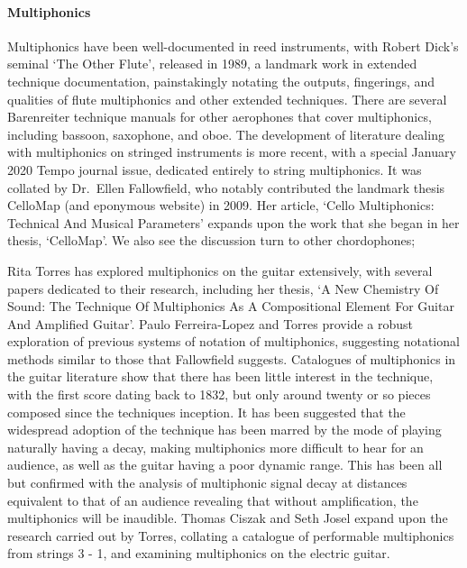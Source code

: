 \paragraph{Multiphonics}
Multiphonics have been well-documented in reed instruments, with Robert Dick's seminal `The Other Flute', released in 1989, a landmark work in extended technique documentation, painstakingly notating the outputs, fingerings, and qualities of flute multiphonics and other extended techniques.\autocite{dickOtherFlute1989}
There are several Barenreiter technique manuals for other aerophones that cover multiphonics, including bassoon, saxophone, and oboe.\autocite{weissTechniquesSaxophonePlaying2010,galloisTechniquesBassoonPlaying2009, TODO:OboeBook}
The development of literature dealing with multiphonics on stringed instruments is more recent, with a special January 2020 Tempo journal issue, dedicated entirely to string multiphonics.
It was collated by Dr.\ Ellen Fallowfield, who notably contributed the landmark thesis CelloMap (and eponymous website) in 2009.\autocite{fallowfieldCelloMapHandbook2009, fallowfieldCelloMap}
Her article, `Cello Multiphonics: Technical And Musical Parameters' expands upon the work that she began in her thesis, `CelloMap'.\autocite{fallowfieldCelloMultiphonicsTechnical2020}
We also see the discussion turn to other chordophones; 


Rita Torres has explored multiphonics on the guitar extensively, with several papers dedicated to their research, including her thesis, `A New Chemistry Of Sound: The Technique Of Multiphonics As A Compositional Element For Guitar And Amplified Guitar'.\autocite{torresMultiphonicsCompositionalElement2012}
Paulo Ferreira-Lopez and Torres provide a robust exploration of previous systems of notation of multiphonics, suggesting notational methods similar to those that Fallowfield suggests.\autocite{ferreira-lopesGuitarMultiphonicsNotations}
Catalogues of multiphonics in the guitar literature show that there has been little interest in the technique, with the first score dating back to 1832, but only around twenty or so pieces composed since the techniques inception.\autocite[80--82]{torresSoundWorldGuitar2018}
It has been suggested that the widespread adoption of the technique has been marred by the mode of playing naturally having a decay, making multiphonics more difficult to hear for an audience, as well as the guitar having a poor dynamic range.\autocite[21--22]{Torres2014TowardsOT}
This has been all but confirmed with the analysis of multiphonic signal decay at distances equivalent to that of an audience revealing that without amplification, the multiphonics will be inaudible.\autocite[279]{torresGuitarMultiphonicsInfluence2014}
Thomas Ciszak and Seth Josel expand upon the research carried out by Torres, collating a catalogue of performable multiphonics from strings 3 - 1, and examining multiphonics on the electric guitar.\autocite{ciszakNeonLightMultiphonic2020}